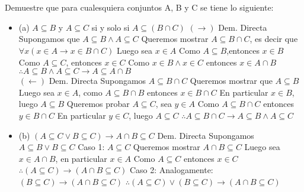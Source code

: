 \section{}
Demuestre que para cualesquiera conjuntos A, B y C se tiene lo siguiente:
\begin{itemize}
	 \item (a) $A \subseteq B$ y $A \subseteq C$ si y solo si $A \subseteq (B \cap C)$\newline
	 $(\rightarrow)$ Dem. Directa\newline
	 Supongamos que $A \subseteq B \wedge A \subseteq C$\newline
	 Queremos mostrar $A \subseteq B \cap C$, es decir que $\forall x (x \in A \rightarrow x \in B \cap C)$\newline
	 Luego sea $x \in A$\newline
	 Como $A \subseteq B$,entonces $x \in B$\newline
	 Como $A \subseteq C$, entonces $x \in C$\newline
	 Como $x \in B \wedge x \in C $ entonces $x \in A \cap B$\newline
	 $\therefore A \subseteq B \wedge A \subseteq C \rightarrow A \subseteq A \cap B$\newline\\
	 
	 $(\leftarrow)$ Dem. Directa\newline
	 Supongamos $A \subseteq B \cap C$\newline
	 Queremos mostrar que $A \subseteq B$\newline
	 Luego sea $x \in A$, como $A\subseteq B \cap B$ entonces $x \in B \cap C$\newline
	 En particular $x \in B$, luego $A \subseteq B$\newline
	 Queremos probar $A \subseteq C$, sea $y \in A$\newline
	 Como $A \subseteq B \cap C $ entonces $y \in B \cap C$\newline
	 En particular $y \in C$, luego $A \subseteq C$\newline
	 $\therefore A \subseteq B \cap C \rightarrow A \subseteq B \wedge A \subseteq C$
	 
	 \item (b) $(A \subseteq C \lor B \subseteq C) \rightarrow A \cap B \subseteq C$\newline
	 Dem. Directa\newline
	 Supongamos $A \subseteq B \lor B \subseteq C$\newline
	 Caso 1: $A \subseteq C$\newline
	 Queremos mostrar $A \cap B \subseteq C$ \newline
	 Luego sea $x \in A \cap B$, en particular $x \in A$ \newline
	 Como $A \subseteq C$ entonces $x \in C$\newline
	 $\therefore (A \subseteq C) \rightarrow (A \cap B \subseteq C)$\newline
	 Caso 2: Analogamente:\newline
	 $(B \subseteq C ) \rightarrow (A \cap B \subseteq C)$\newline
	 $\therefore (A \subseteq C) \lor (B \subseteq C) \rightarrow (A \cap B \subseteq C)$
	 

\end{itemize}
